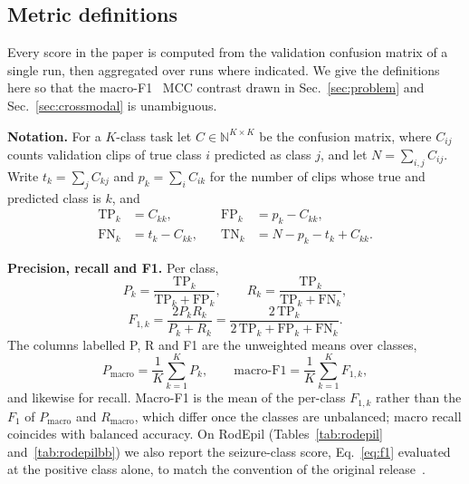 \subsection{Metric definitions}
\label{sec:metrics}

Every score in the paper is computed from the validation confusion matrix of a
single run, then aggregated over runs where indicated. We give the definitions here
so that the macro-F1 \vs\ MCC contrast drawn in Sec.~\ref{sec:problem} and
Sec.~\ref{sec:crossmodal} is unambiguous.

\noindent\textbf{Notation.}
For a $K$-class task let $C\in\mathbb{N}^{K\times K}$ be the confusion matrix, where
$C_{ij}$ counts validation clips of true class $i$ predicted as class $j$, and let
$N=\sum_{i,j}C_{ij}$. Write $t_k=\sum_j C_{kj}$ and $p_k=\sum_i C_{ik}$ for the
number of clips whose true and predicted class is $k$, and
\begin{equation}
\begin{aligned}
\mathrm{TP}_k &= C_{kk}, &\quad
\mathrm{FP}_k &= p_k-C_{kk}, \\
\mathrm{FN}_k &= t_k-C_{kk}, &\quad
\mathrm{TN}_k &= N-p_k-t_k+C_{kk}.
\end{aligned}
\label{eq:cm}
\end{equation}

\noindent\textbf{Precision, recall and F1.}
Per class,
\begin{equation}
P_k=\frac{\mathrm{TP}_k}{\mathrm{TP}_k+\mathrm{FP}_k},\qquad
R_k=\frac{\mathrm{TP}_k}{\mathrm{TP}_k+\mathrm{FN}_k},
\label{eq:pr}
\end{equation}
\begin{equation}
F_{1,k}=\frac{2P_kR_k}{P_k+R_k}
=\frac{2\,\mathrm{TP}_k}{2\,\mathrm{TP}_k+\mathrm{FP}_k+\mathrm{FN}_k}.
\label{eq:f1}
\end{equation}
The columns labelled P, R and F1 are the unweighted means over classes,
\begin{equation}
P_{\mathrm{macro}}=\frac{1}{K}\sum_{k=1}^{K}P_k,\qquad
\text{macro-F1}=\frac{1}{K}\sum_{k=1}^{K}F_{1,k},
\label{eq:macro}
\end{equation}
and likewise for recall. Macro-F1 is the mean of the per-class $F_{1,k}$ rather than
the $F_1$ of $P_{\mathrm{macro}}$ and $R_{\mathrm{macro}}$, which differ once the
classes are unbalanced; macro recall coincides with balanced accuracy. On
RodEpil (Tables~\ref{tab:rodepil} and~\ref{tab:rodepilbb}) we also report the
seizure-class score, Eq.~\eqref{eq:f1} evaluated at the positive class alone, to
match the convention of the original release~\cite{rodepil2025}.

